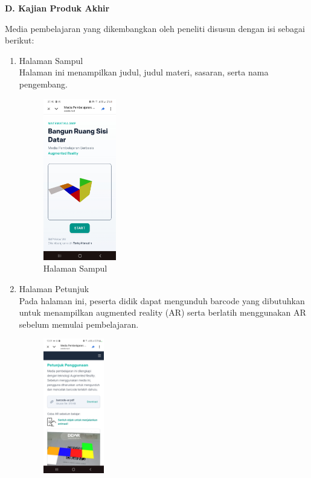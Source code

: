 \documentclass[12pt]{article}
\begin{document}
\textbf{D. Kajian Produk Akhir}

\hspace*{1cm}Media pembelajaran yang dikembangkan oleh peneliti disusun dengan isi sebagai berikut:
\begin{enumerate}
    \item Halaman Sampul\\
    \hspace*{1cm}Halaman ini menampilkan judul, judul materi, sasaran, serta nama pengembang.
    \begin{figure}[H]
        \centering
        \includegraphics[width=0.3\textwidth]{images/ui-1.jpg}
        \caption{Halaman Sampul}
        \label{fig:sampul}
    \end{figure}
    \item Halaman Petunjuk\\
    \hspace*{1cm}Pada halaman ini, peserta didik dapat mengunduh barcode yang dibutuhkan untuk menampilkan augmented reality (AR) serta berlatih menggunakan AR sebelum memulai pembelajaran.
    \begin{figure}[H]
        \centering
        \includegraphics[width=0.25\textwidth]{images/petunjuk.jpg}

\end{figure}
\end{enumerate}
\end{document}
